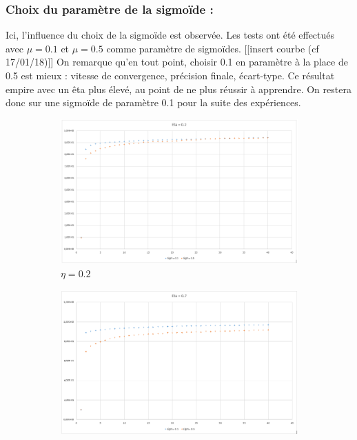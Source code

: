 \subsubsection*{Choix du paramètre de la sigmoïde :}
Ici, l’influence du choix de la sigmoïde est observée. Les tests ont été effectués avec $\mu = 0.1$ et $\mu = 0.5$ comme paramètre de sigmoïdes.
[[insert courbe (cf 17/01/18)]]
On remarque qu’en tout point, choisir 0.1 en paramètre à la place de 0.5 est mieux : vitesse de convergence, précision finale, écart-type. Ce résultat empire avec un êta plus élevé, au point de ne plus réussir à apprendre. On restera donc sur une sigmoïde de paramètre 0.1 pour la suite des expériences.

\begin{figure}[h!]
  \centering
  \begin{subfigure}[b]{.5\linewidth}
    \includegraphics[width=\linewidth]{fig/MNIST_inflsigm_eta02.png}
    \caption{$\eta=0.2$}
  \end{subfigure}
  \quad
  \begin{subfigure}[b]{.5\linewidth}
    \includegraphics[width=\linewidth]{fig/MNIST_inflsigm_eta07.png}

\end{subfigure}
\end{figure}
